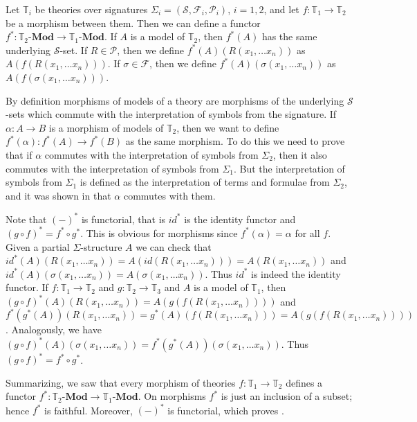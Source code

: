 \documentclass[reqno]{amsart}
\theoremstyle{definition}
\theoremstyle{remark}
\newcommand{\cat}[1]{\mathbf{#1}}
\newcommand{\Mod}[1]{#1\text{-}\cat{Mod}}
\numberwithin{figure}{section}
\begin{document}
Let $\mathbb{T}_i$ be theories over signatures $\Sigma_i = (\mathcal{S},\mathcal{F}_i,\mathcal{P}_i)$, $i = 1,2$,
    and let $f : \mathbb{T}_1 \to \mathbb{T}_2$ be a morphism between them.
Then we can define a functor $f^* : \Mod{\mathbb{T}_2} \to \Mod{\mathbb{T}_1}$.
If $A$ is a model of $\mathbb{T}_2$, then $f^*(A)$ has the same underlying $\mathcal{S}$-set.
If $R \in \mathcal{P}$, then we define $f^*(A)(R(x_1, \ldots x_n))$ as $A(f(R(x_1, \ldots x_n)))$.
If $\sigma \in \mathcal{F}$, then we define $f^*(A)(\sigma(x_1, \ldots x_n))$ as $A(f(\sigma(x_1, \ldots x_n)))$.

By definition morphisms of models of a theory are morphisms of the underlying $\mathcal{S}$-sets which commute with the interpretation of symbols from the signature.
If $\alpha : A \to B$ is a morphism of models of $\mathbb{T}_2$, then we want to define $f^*(\alpha) : f^*(A) \to f^*(B)$ as the same morphism.
To do this we need to prove that if $\alpha$ commutes with the interpretation of symbols from $\Sigma_2$, then it also commutes with the interpretation of symbols from $\Sigma_1$.
But the interpretation of symbols from $\Sigma_1$ is defined as the interpretation of terms and formulae from $\Sigma_2$, and it was shown in \cite{PHL} that $\alpha$ commutes with them.

Note that $(-)^*$ is functorial, that is $id^*$ is the identity functor and $(g \circ f)^* = f^* \circ g^*$.
This is obvious for morphisms since $f^*(\alpha) = \alpha$ for all $f$.
Given a partial $\Sigma$-structure $A$ we can check that $id^*(A)(R(x_1, \ldots x_n)) = A(id(R(x_1, \ldots x_n))) = A(R(x_1, \ldots x_n))$
    and $id^*(A)(\sigma(x_1, \ldots x_n)) = A(\sigma(x_1, \ldots x_n))$.
Thus $id^*$ is indeed the identity functor.
If $f : \mathbb{T}_1 \to \mathbb{T}_2$ and $g : \mathbb{T}_2 \to \mathbb{T}_3$ and $A$ is a model of $\mathbb{T}_1$,
    then $(g \circ f)^*(A)(R(x_1, \ldots x_n)) = A(g(f(R(x_1, \ldots x_n))))$ and $f^*(g^*(A))(R(x_1, \ldots x_n)) = g^*(A)(f(R(x_1, \ldots x_n))) = A(g(f(R(x_1, \ldots x_n))))$.
Analogously, we have $(g \circ f)^*(A) \allowbreak (\sigma(x_1, \ldots x_n)) = f^*(g^*(A))(\sigma(x_1, \ldots x_n))$.
Thus $(g \circ f)^* = f^* \circ g^*$.

Summarizing, we saw that every morphism of theories $f : \mathbb{T}_1 \to \mathbb{T}_2$ defines a functor $f^* : \Mod{\mathbb{T}_2} \to \Mod{\mathbb{T}_1}$.
On morphisms $f^*$ is just an inclusion of a subset; hence $f^*$ is faithful.
Moreover, $(-)^*$ is functorial, which proves .
\end{document}
